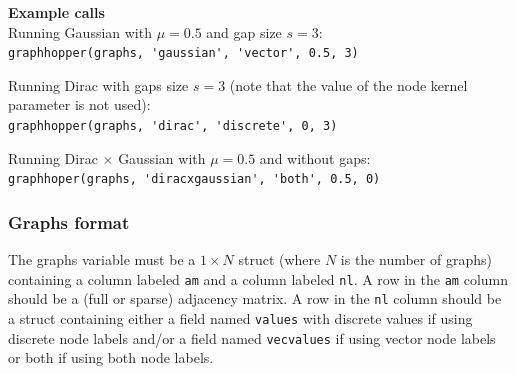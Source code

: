 \documentclass{article}
\begin{document}
\begin{appendices}
\textbf{Example calls}\\
Running Gaussian with $\mu=0.5$ and gap size $s=3$:\\
\verb|graphhopper(graphs, 'gaussian', 'vector', 0.5, 3)|

Running Dirac with gaps size $s=3$ (note that the value of the node kernel parameter is not used):\\
\verb|graphhopper(graphs, 'dirac', 'discrete', 0, 3)|

Running Dirac $\times$ Gaussian with $\mu=0.5$ and without gaps:\\
\verb|graphhoper(graphs, 'diracxgaussian', 'both', 0.5, 0)|


\subsubsection{Graphs format}
\label{appendix:graphs-format}
The graphs variable must be a $1\times N$ struct (where $N$ is the number of graphs) containing a column labeled \verb|am| and a column labeled \verb|nl|. A row in the \verb|am| column should be a (full or sparse) adjacency matrix. A row in the \verb|nl| column should be a struct containing either a field named \verb|values| with discrete values if using discrete node labels and/or a field named \verb|vecvalues| if using vector node labels or both if using both node labels.

\end{appendices}
\end{document}
